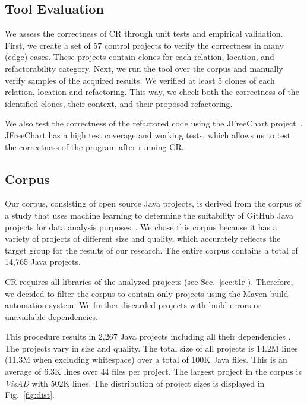 \documentclass[sigconf,review,anonymous]{acmart}
\begin{document}
\subsection{Tool Evaluation}
We assess the correctness of CR through unit tests and empirical validation. First, we create a set of 57 control projects to verify the correctness in many (edge) cases. These projects contain clones for each relation, location, and refactorability category. 
Next, we run the tool over the corpus and manually verify samples of the acquired results. We verified at least 5 clones of each relation, location and refactoring. This way, we check both the correctness of the identified clones, their context, and their proposed refactoring.

We also test the correctness of the refactored code using the JFreeChart project~\cite{gilbert2002jfreechart}. JFreeChart has a high test coverage and working tests, which allows us to test the correctness of the program after running CR.



\subsection{Corpus}
Our corpus, consisting of open source Java projects, is derived from the corpus of a study that uses machine learning to determine the suitability of GitHub Java projects for data analysis purposes~\cite{githubCorpus2013}. We chose this corpus because it has a variety of projects of different size and quality, which accurately reflects the target group for the results of our research. The entire corpus contains a total of 14,765 Java projects.

CR requires all libraries of the analyzed projects
(see Sec.~\ref{sec:t1r}). Therefore, we decided to filter the corpus to contain only projects using the Maven build automation system. We further discarded projects with build errors or unavailable dependencies. %

This procedure results in 2,267 Java projects including all their dependencies%
. The projects vary in size and quality. The total size of all projects is 14.2M lines (11.3M when excluding whitespace) over a total of 100K Java files. This is an average of 6.3K lines over 44 files per project. The largest project in the corpus is \textit{VisAD} with 502K lines. The distribution of project sizes is displayed in Fig.~\ref{fig:dist}.
\end{document}
